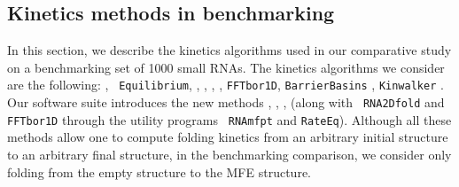 \subsection*{Kinetics methods in benchmarking}

In this section, we describe the kinetics algorithms used in our
comparative study on a benchmarking set of 1000 small RNAs. The
kinetics algorithms we consider are the following: \rnamfpt, {\tt
Equilibrium}, \kinfold \citep{flamm}, \fftmfpt, \ffteq,
\rnatwofold, {\tt FFTbor1D}, {\tt BarrierBasins}
\citep{wolfingerStadler:kinetics}, {\tt Kinwalker} \citep{Geis.jmb08}.
Our software suite \hermes introduces the new methods \rnamfpt,
\rnaeq, \fftmfpt, \ffteq (along with {\tt
RNA2Dfold} and {\tt FFTbor1D} through the utility programs {\tt
RNAmfpt} and {\tt RateEq}). Although all these methods allow one to
compute folding kinetics from an arbitrary initial structure to an
arbitrary final structure, in the benchmarking comparison, we consider
only folding from the empty structure to the MFE structure.
